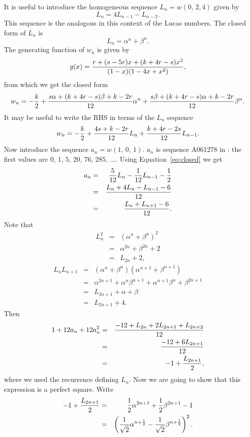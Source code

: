 \noindent
It is useful to introduce the homogeneous sequence $L_n=w(0,\,2,4)$
given by
$$L_n=4L_{n-1}-L_{n-2}.$$
This sequence is the analogous in this context of the Lucas numbers.
The closed form of $L_n$ is
$$L_n=\alpha^n+\beta^n.$$
The generating function of $w_n$ is given by
$$g(x)={r+(s-5r)x+(k+4r-s)x^2\over (1-x)(1-4x+x^2)},$$
from which we get the closed form
\begin{equation}
w_n=-{k\over 2}+{s\alpha+(k+4r-s)\beta+k-2r\over 12}\alpha^n+
{s\beta+(k+4r-s)\alpha+k-2r\over 12}\beta^n.
\end{equation}
It may be useful to write the RHS in terms of the $L_n$ sequence
\begin{equation}
\label{eq:closed}
w_n=-{k\over 2}+{4s+k-2r\over 12}L_n+{k+4r-2s\over 12}L_{n-1}.
\end{equation}
Now introduce the sequence $a_n=w(1,\,0,\,1)$. $a_n$ is sequence A061278 in
\cite{sloane}: the first values are $0,\,1,\,5,\,20,\,76,\,285,\,\ldots$.
Using
Equation~\ref{eq:closed} we get
\begin{eqnarray*}
a_n&=&{5\over 12}L_n-{1\over 12}L_{n-1}-{1\over 2}\\
&=&{L_n+4L_n-L_{n-1}-6\over 12}\\
&=&{L_n+L_{n+1}-6\over 12}.
\end{eqnarray*}
Note that
\begin{eqnarray*}
L_n^2&=&(\alpha^n+\beta^n)^2\\
&=&\alpha^{2n}+\beta^{2n}+2\\
&=&L_{2n}+2,
\end{eqnarray*}
\begin{eqnarray*}
L_nL_{n+1}&=&(\alpha^n+\beta^n)(\alpha^{n+1}+\beta^{n+1})\\
&=&\alpha^{2n+1}+\alpha^n\beta^{n+1}+\alpha^{n+1}\beta^n+\beta^{2n+1}\\
&=&L_{2n+1}+\alpha+\beta\\
&=&L_{2n+1}+4.
\end{eqnarray*}
Then
\begin{eqnarray*}
1+12a_n+12a_n^2&=&{-12+L_{2n}+2L_{2n+1}+L_{2n+2}\over 12}\\
&=&{-12+6L_{2n+1}\over 12}\\
&=&-1+{L_{2n+1}\over 2},
\end{eqnarray*}
where we used the recurrence defining $L_{n}$. Now we are going to show
that this expression is a perfect square. Write
\begin{eqnarray*}
-1+{L_{2n+1}\over 2}&=&{1\over 2}\alpha^{2n+1}+{1\over 2}\beta^{2n+1}-1\\
&=&\left ({1\over \sqrt{2}}\alpha^{n+{1\over 2}}-
{1\over \sqrt{2}}\beta^{n+{1\over 2}}\right )^2.
\end{eqnarray*}
